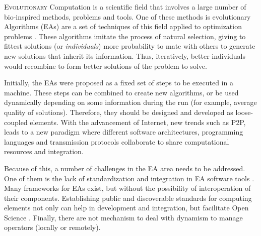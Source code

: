 \lettrine{E}{volutionary} Computation is a scientific field that
involves a large number of bio-inspired methods, problems and
tools. One of these methods is evolutionary Algorithms (EAs) are a set
of techniques of this field applied to optimization problems
\cite{eiben2010whatis}. These algorithms imitate the process of
natural selection, giving to fittest solutions (or {\em individuals})
more probability to mate with others to generate new solutions that
inherit its information. Thus, iteratively, better individuals would
recombine to form better solutions of the problem to solve. %

Initially, the EAs were proposed as a fixed set of steps to be
executed in a machine. %
These steps can be combined to create new algorithms, or be used %
dynamically  depending on some information during the run (for
example, average quality of solutions). Therefore, they should be
designed and developed as loose-coupled elements. With the advancement
of Internet, new trends such as P2P, leads to a new paradigm where
different software architectures, programming languages and
transmission protocols collaborate to share computational resources
and integration.  

Because of this, %
a number of challenges in the EA area needs to be addressed.  One of
them is the lack of standardization and integration in EA software
tools \cite{SURVEYMOFS}. Many frameworks for EAs exist, but without
the possibility of interoperation of their components. %
Establishing public and discoverable standards for computing elements
not only can help in development and integration, but facilitate Open
Science \cite{Foster2005Science}. Finally, there are not mechanism to
deal with dynamism to manage operators (locally or remotely). %

